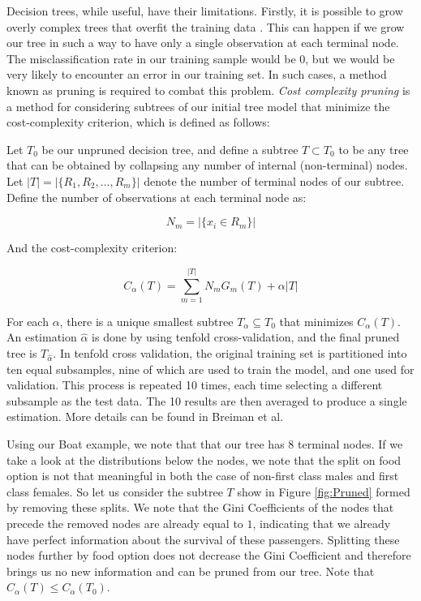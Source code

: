 \documentclass[preprint,12pt]{elsarticle}
\begin{document}
Decision trees, while useful, have their limitations. Firstly, it is possible to grow overly complex trees that overfit the training data \cite{ISLR}. This can happen if we grow our tree in such a way to have only a single observation at each terminal node. The misclassification rate in our training sample would be $0$, but we would be very likely to encounter an error in our training set. In such cases, a method known as pruning is required to combat this problem. \textit{Cost complexity pruning} is a method for considering subtrees of our initial tree model that minimize the cost-complexity criterion, which is defined as follows\cite{ESL}:


Let $T_{0}$ be our unpruned decision tree, and define a subtree $T \subset T_{0}$ to be any tree that can be obtained by collapsing any number of internal (non-terminal) nodes. Let $|T| = |\{R_{1}, R_{2}, \ldots, R_{m}\}|$ denote the number of terminal nodes of our subtree. Define the number of observations at each terminal node as:

$$N_{m} = |\{x_{i} \in R_{m}\}| $$

\noindent And the cost-complexity criterion:

$$C_{\alpha}(T) = \sum\limits_{m=1}^{|T|} N_{m}G_{m}(T) + \alpha|T|$$

For each $\alpha$, there is a unique smallest subtree $T_{\alpha} \subseteq T_{0}$ that minimizes $C_{\alpha}(T)$. An estimation  $\hat{\alpha}$ is done by using tenfold cross-validation, and the final pruned tree is $T_{\hat{\alpha}}$. In tenfold cross validation, the original training set is partitioned into ten equal subsamples, nine of which are used to train the model, and one used for validation. This process is repeated 10 times, each time selecting a different subsample as the test data. The 10 results are then averaged to produce a single estimation. More details can be found in Breiman et al.\cite{Breiman1984}

Using our Boat example, we note that that our tree has 8 terminal nodes. If we take a look at the distributions below the nodes, we note that the split on food option is not that meaningful in both the case of non-first class males and first class females. So let us consider the subtree $T$ show in Figure \ref{fig:Pruned} formed by removing these splits. We note that the Gini Coefficients of the nodes that precede the removed nodes are already equal to $1$, indicating that we already have perfect information about the survival of these passengers. Splitting these nodes further by food option does not decrease the Gini Coefficient and therefore brings us no new information and can be pruned from our tree. Note that $C_{\alpha}(T) \leq C_{\alpha}(T_{0})$.
\end{document}

